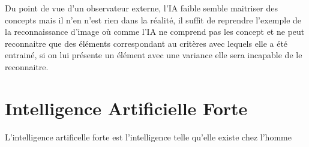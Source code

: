 Du point de vue d'un observateur externe, l'IA faible
semble maitriser des concepts mais il n'en n'est rien dans la 
réalité, il suffit de reprendre l'exemple de la reconnaissance d'image
où comme l'IA ne comprend pas les concept et ne peut reconnaitre 
que des éléments correspondant au critères avec lequels elle a été 
entrainé, si on lui présente un élément avec une variance elle 
sera incapable de le reconnaitre.

\newpage
\section{Intelligence Artificielle Forte}
L'intelligence artificelle forte est l'intelligence
telle qu'elle existe chez l'homme




